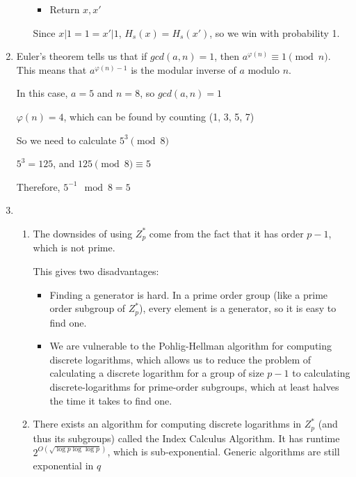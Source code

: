 \begin{enumerate}[label=(\alph*)]
\begin{enumerate}[label=(\roman*)]
\begin{itemize}
              \item
            Return $x, x'$
            \end{itemize}

            Since $x | 1 = 1 = x' | 1$, $H_s(x) = H_s(x')$, so we win with probability 1.
        \end{enumerate}

      \item
        Euler's theorem tells us that if $gcd(a,n) = 1$, then $a^{\varphi(n)} \equiv 1 \pmod{n}$. This means that $a^{\varphi(n) - 1}$ is the modular inverse of $a$ modulo $n$.

        In this case, $a=5$ and $n=8$, so $gcd(a,n) = 1$

        $\varphi(n) = 4$, which can be found by counting (1, 3, 5, 7)

        So we need to calculate $5^3 \pmod{8}$

        $5^3 = 125$, and $125 \pmod{8} \equiv 5$

        Therefore, $5^{-1} \mod 8 = 5$

      \item
        \begin{enumerate}[label=(\roman*)]
          \item

            The downsides of using $Z^*_p$ come from the fact that it has order $p-1$, which is not prime.

            This gives two disadvantages:

            \begin{itemize}
                \item
                  Finding a generator is hard. In a prime order group (like a prime order subgroup of $Z^*_p$), every element is a generator, so it is easy to find one.

                \item
                  We are vulnerable to the Pohlig-Hellman algorithm for computing discrete logarithms, which allows us to reduce the problem of calculating a discrete logarithm for a group of size $p-1$ to calculating discrete-logarithms for prime-order subgroups, which at least halves the time it takes to find one.
            \end{itemize}

          \item
            There exists an algorithm for computing discrete logarithms in $Z_p^*$ (and thus its subgroups) called the Index Calculus Algorithm. It has runtime $2^{O(\sqrt{\log p \log \log p})}$, which is sub-exponential. Generic algorithms are still exponential in $q$


\end{enumerate}
\end{enumerate}
